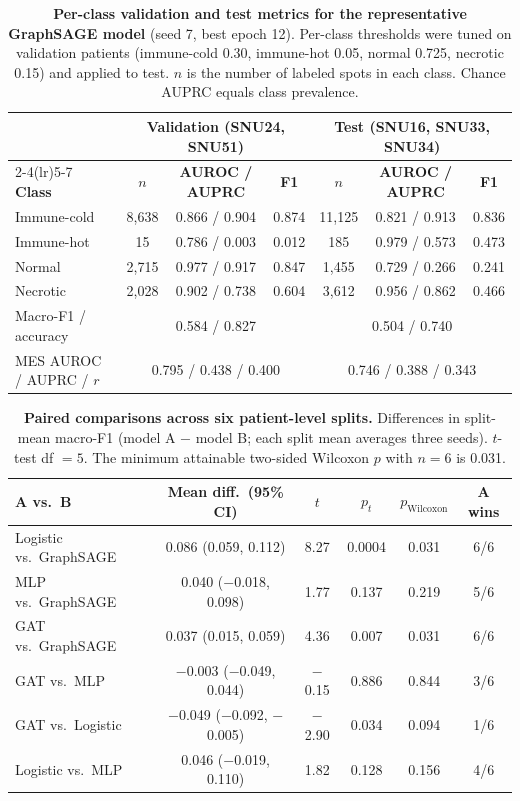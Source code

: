 \documentclass[11pt,letterpaper]{article}
\begin{document}
\begin{table}[H]
\centering
\caption{\textbf{Per-class validation and test metrics for the representative GraphSAGE model} (seed 7, best epoch 12). Per-class thresholds were tuned on validation patients (immune-cold 0.30, immune-hot 0.05, normal 0.725, necrotic 0.15) and applied to test. $n$ is the number of labeled spots in each class. Chance AUPRC equals class prevalence.}
\label{tab:s8}
\small
\begin{tabular}{lcccccc}
\toprule
 & \multicolumn{3}{c}{\textbf{Validation (SNU24, SNU51)}} & \multicolumn{3}{c}{\textbf{Test (SNU16, SNU33, SNU34)}} \\
\cmidrule(lr){2-4}\cmidrule(lr){5-7}
\textbf{Class} & $n$ & \textbf{AUROC / AUPRC} & \textbf{F1} & $n$ & \textbf{AUROC / AUPRC} & \textbf{F1} \\
\midrule
Immune-cold & 8{,}638 & 0.866 / 0.904 & 0.874 & 11{,}125 & 0.821 / 0.913 & 0.836 \\
Immune-hot  & 15      & 0.786 / 0.003 & 0.012 & 185     & 0.979 / 0.573 & 0.473 \\
Normal      & 2{,}715 & 0.977 / 0.917 & 0.847 & 1{,}455 & 0.729 / 0.266 & 0.241 \\
Necrotic    & 2{,}028 & 0.902 / 0.738 & 0.604 & 3{,}612 & 0.956 / 0.862 & 0.466 \\
\midrule
Macro-F1 / accuracy & \multicolumn{3}{c}{0.584 / 0.827} & \multicolumn{3}{c}{0.504 / 0.740} \\
MES AUROC / AUPRC / $r$ & \multicolumn{3}{c}{0.795 / 0.438 / 0.400} & \multicolumn{3}{c}{0.746 / 0.388 / 0.343} \\
\bottomrule
\end{tabular}
\end{table}

\vspace{1.5em}

\begin{table}[H]
\centering
\caption{\textbf{Paired comparisons across six patient-level splits.} Differences in split-mean macro-F1 (model A $-$ model B; each split mean averages three seeds). $t$-test df $= 5$. The minimum attainable two-sided Wilcoxon $p$ with $n = 6$ is 0.031.}
\label{tab:s9}
\small
\begin{tabular}{lccccc}
\toprule
\textbf{A vs.\ B} & \textbf{Mean diff.\ (95\% CI)} & $t$ & $p_t$ & $p_\mathrm{Wilcoxon}$ & \textbf{A wins} \\
\midrule
Logistic vs.\ GraphSAGE & 0.086 (0.059, 0.112)   & 8.27  & 0.0004 & 0.031 & 6/6 \\
MLP vs.\ GraphSAGE      & 0.040 ($-$0.018, 0.098) & 1.77  & 0.137  & 0.219 & 5/6 \\
GAT vs.\ GraphSAGE      & 0.037 (0.015, 0.059)   & 4.36  & 0.007  & 0.031 & 6/6 \\
GAT vs.\ MLP            & $-$0.003 ($-$0.049, 0.044) & $-$0.15 & 0.886 & 0.844 & 3/6 \\
GAT vs.\ Logistic       & $-$0.049 ($-$0.092, $-$0.005) & $-$2.90 & 0.034 & 0.094 & 1/6 \\
Logistic vs.\ MLP       & 0.046 ($-$0.019, 0.110) & 1.82  & 0.128  & 0.156 & 4/6 \\
\bottomrule
\end{tabular}
\end{table}
\end{document}
